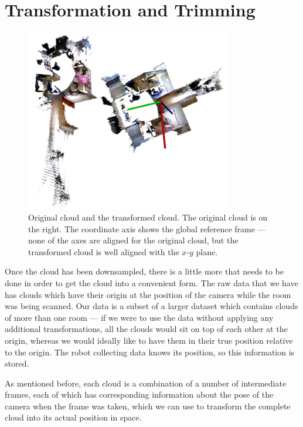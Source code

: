 \documentclass[11pt,a4paper]{kth-mag}
\begin{document}
\section{Transformation and Trimming}
\begin{figure}[t]
  \centering
  \includegraphics[width=0.8\textwidth]{images/orig_transformed}
  \caption{Original cloud and the transformed cloud. The original cloud
    is on the right. The coordinate axis shows the global reference frame ---
    none of the axes are aligned for the original cloud, but the transformed
    cloud is well aligned with the $x$-$y$ plane.}
  \label{fig:orig_transformed}
\end{figure}

Once the cloud has been downsampled, there is a little more that needs to be
done in order to get the cloud into a convenient form. The raw data that we have
has clouds which have their origin at the position of the camera while the room
was being scanned. Our data is a subset of a larger dataset which contains
clouds of more than one room --- if we were to use the data without applying any
additional transformations, all the clouds would sit on top of each other at the
origin, whereas we would ideally like to have them in their true position
relative to the origin. The robot collecting data knows its position, so this
information is stored.

As mentioned before, each cloud is a combination of a number of intermediate
frames, each of which has corresponding information about the pose of the camera
when the frame was taken, which we can use to transform the complete cloud into
its actual position in space.
\end{document}
